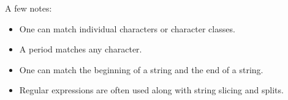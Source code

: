 {\begin{frame}[fragile]
  \pause
  \vspace{5mm}
  A few notes:
  \begin{itemize}
    \item One can match individual characters or character classes.
    \item A period matches any character.
    \item One can match the beginning of a string and the end of a string.
    \item Regular expressions are often used along with string slicing and splits.
  \end{itemize}
\end{frame}

}


